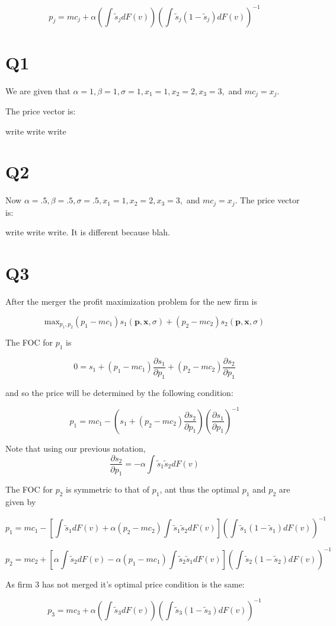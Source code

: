 \documentclass{article}
\newcommand{\1}{\mathbbm{1}}
\begin{document}
\begin{equation}\label{price}
p_j = mc_j +\alpha (\int \tilde{s}_j dF(v))(\int \tilde{s}_j(1-\tilde{s}_j)dF(v))^{-1}
\end{equation}

\section{Q1}
We are given that $\alpha = 1, \beta = 1, \sigma = 1, x_1 = 1, x_2 = 2, x_3 = 3,$ and $mc_j = x_j$. 

The price vector is: 

\color{red}
write write write
\color{black}

\section{Q2}
Now $\alpha = .5, \beta = .5, \sigma = .5, x_1 = 1, x_2 = 2, x_3 = 3,$ and $mc_j = x_j$. 
The price vector is: 

\color{red}
write write write. It is different because blah.
\color{black}


\section{Q3}
After the merger the profit maximization problem for the new firm is  

$$\text{max}_{p_1, p_2} (p_1 - mc_1)s_1(\bm p, \bm x, \sigma) + (p_2 - mc_2)s_2(\bm p, \bm x, \sigma)$$

The FOC for $p_1$ is 

$$0 = s_1 + (p_1 - mc_1)\frac{\partial s_1}{\partial p_1}   + (p_2 - mc_2)\frac{\partial s_2}{\partial p_1}$$

and so the price will be determined by the following condition:

$$p_1 = mc_1 - (s_1 + (p_2 - mc_2)\frac{\partial s_2}{\partial p_1})(\frac{\partial s_1}{\partial p_1})^{-1}$$

Note that using our previous notation,
$$\frac{\partial s_2}{\partial p_1} = - \alpha \int \tilde{s}_1\tilde{s}_2dF(v)$$

The FOC for $p_2$ is symmetric to that of $p_1$, ant thus the optimal $p_1$ and $p_2$ are given by

$$p_1 = mc_1 -[\int \tilde{s}_1 dF(v)+ \alpha (p_2 - mc_2)\int \tilde{s}_1\tilde{s}_2dF(v)](\int \tilde{s}_1(1-\tilde{s}_1)dF(v))^{-1}$$


$$p_2 = mc_2 + [\alpha\int \tilde{s}_2 dF(v) - \alpha (p_1 - mc_1)\int \tilde{s}_2\tilde{s}_1dF(v)](\int \tilde{s}_2(1-\tilde{s}_2)dF(v))^{-1}$$

As firm 3 has not merged it's optimal price condition is the same:

$$ p_3 = mc_3 +\alpha (\int \tilde{s}_3 dF(v))(\int \tilde{s}_3(1-\tilde{s}_3)dF(v))^{-1}$$
\end{document}
